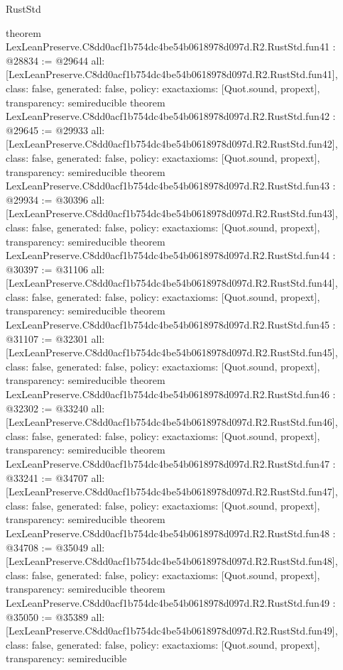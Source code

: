 \begin{lexlean}{RustStd}
\begin{coremodule}
{}
theorem LexLeanPreserve.C8dd0acf1b754dc4be54b0618978d097d.R2.RustStd.fun41 : @28834 := @29644 {
  all: [LexLeanPreserve.C8dd0acf1b754dc4be54b0618978d097d.R2.RustStd.fun41],
  class: false,
  generated: false,
  policy: exact{axioms: [Quot.sound, propext]},
  transparency: semireducible
}
theorem LexLeanPreserve.C8dd0acf1b754dc4be54b0618978d097d.R2.RustStd.fun42 : @29645 := @29933 {
  all: [LexLeanPreserve.C8dd0acf1b754dc4be54b0618978d097d.R2.RustStd.fun42],
  class: false,
  generated: false,
  policy: exact{axioms: [Quot.sound, propext]},
  transparency: semireducible
}
theorem LexLeanPreserve.C8dd0acf1b754dc4be54b0618978d097d.R2.RustStd.fun43 : @29934 := @30396 {
  all: [LexLeanPreserve.C8dd0acf1b754dc4be54b0618978d097d.R2.RustStd.fun43],
  class: false,
  generated: false,
  policy: exact{axioms: [Quot.sound, propext]},
  transparency: semireducible
}
theorem LexLeanPreserve.C8dd0acf1b754dc4be54b0618978d097d.R2.RustStd.fun44 : @30397 := @31106 {
  all: [LexLeanPreserve.C8dd0acf1b754dc4be54b0618978d097d.R2.RustStd.fun44],
  class: false,
  generated: false,
  policy: exact{axioms: [Quot.sound, propext]},
  transparency: semireducible
}
theorem LexLeanPreserve.C8dd0acf1b754dc4be54b0618978d097d.R2.RustStd.fun45 : @31107 := @32301 {
  all: [LexLeanPreserve.C8dd0acf1b754dc4be54b0618978d097d.R2.RustStd.fun45],
  class: false,
  generated: false,
  policy: exact{axioms: [Quot.sound, propext]},
  transparency: semireducible
}
theorem LexLeanPreserve.C8dd0acf1b754dc4be54b0618978d097d.R2.RustStd.fun46 : @32302 := @33240 {
  all: [LexLeanPreserve.C8dd0acf1b754dc4be54b0618978d097d.R2.RustStd.fun46],
  class: false,
  generated: false,
  policy: exact{axioms: [Quot.sound, propext]},
  transparency: semireducible
}
theorem LexLeanPreserve.C8dd0acf1b754dc4be54b0618978d097d.R2.RustStd.fun47 : @33241 := @34707 {
  all: [LexLeanPreserve.C8dd0acf1b754dc4be54b0618978d097d.R2.RustStd.fun47],
  class: false,
  generated: false,
  policy: exact{axioms: [Quot.sound, propext]},
  transparency: semireducible
}
theorem LexLeanPreserve.C8dd0acf1b754dc4be54b0618978d097d.R2.RustStd.fun48 : @34708 := @35049 {
  all: [LexLeanPreserve.C8dd0acf1b754dc4be54b0618978d097d.R2.RustStd.fun48],
  class: false,
  generated: false,
  policy: exact{axioms: [Quot.sound, propext]},
  transparency: semireducible
}
theorem LexLeanPreserve.C8dd0acf1b754dc4be54b0618978d097d.R2.RustStd.fun49 : @35050 := @35389 {
  all: [LexLeanPreserve.C8dd0acf1b754dc4be54b0618978d097d.R2.RustStd.fun49],
  class: false,
  generated: false,
  policy: exact{axioms: [Quot.sound, propext]},
  transparency: semireducible
}
\end{coremodule}
\end{lexlean}
